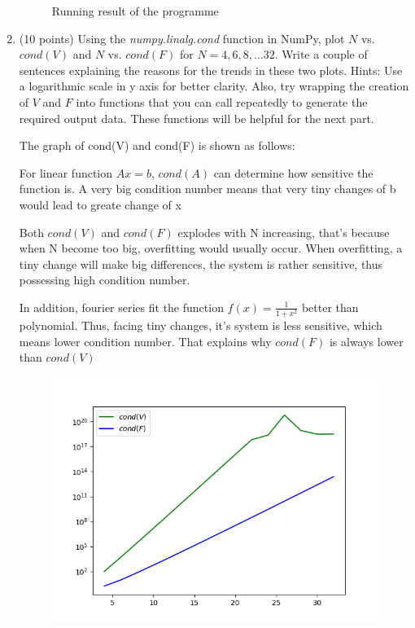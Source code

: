 \documentclass[10pt]{article}
\begin{document}
\begin{enumerate}[label=3.\arabic*]
\begin{figure}[H]
		\caption{Running result of the programme}
	\end{figure}
    \item (10 points)
    Using the \textit{numpy.linalg.cond} function in NumPy, plot $N$ vs. $cond(V)$ and $N$ vs. $cond(F)$ for $N = 4, 6, 8, ...32$. 
    Write a couple of sentences explaining the reasons for the trends in these two plots. Hints: Use a logarithmic scale in y axis for better clarity. Also, try wrapping the creation of $V$ and $F$ into functions that you can call repeatedly to generate the required output data. These functions will be helpful for the next part.\par
    The graph of cond(V) and cond(F) is shown as follows:\par
    For linear function $Ax = b$, $cond(A)$ can determine how sensitive the function is. A very big condition number means that very tiny changes of b would lead to greate change of x\par 
    Both $cond(V)$ and $cond(F)$ explodes with N increasing, that's because when N become too big, overfitting would usually occur. When overfitting, a tiny change will make big differences, the system is rather sensitive, thus possessing high condition number.\par
    In addition, fourier series fit the function $f(x)=\frac{1}{1+x^2}$ better than polynomial. Thus, facing tiny changes, it's system is less sensitive, which means lower condition number. That explains why $cond(F)$ is always lower than $cond(V)$
   	\begin{figure}[H]
   	\centering
   	\includegraphics[width=1\textwidth]{./linear algebra/cond.png}

\end{figure}
\end{enumerate}
\end{document}
